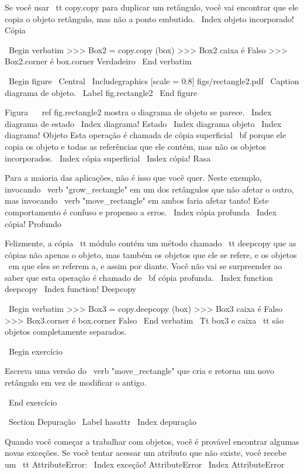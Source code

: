\documentclass[10pt]{book}
\begin{document}
{{{{{{{{{{{{{Se você usar {\ tt copy.copy} para duplicar um retângulo, você vai encontrar
que ele copia o objeto retângulo, mas não a ponto embutido.
\ Index {objeto incorporado! Cópia}

\ Begin {verbatim}
>>> Box2 = copy.copy (box)
>>> Box2 caixa é
Falso
>>> Box2.corner é box.corner
Verdadeiro
\ End {verbatim}

\ Begin {figure}
\ Central
{\ Includegraphics [scale = 0.8] {figs/rectangle2.pdf}}
\ Caption {diagrama de objeto.}
\ Label {} fig.rectangle2
\ End {figure}

Figura ~ \ ref {} fig.rectangle2 mostra o diagrama de objeto se parece.
\ Index {diagrama de estado}
\ Index {diagrama! Estado}
\ Index {diagrama objeto}
\ Index {diagrama! Objeto}
Esta operação é chamada de {cópia superficial \ bf} porque ele copia os
objeto e todas as referências que ele contém, mas não os objetos incorporados.
\ Index {cópia superficial}
\ Index {cópia! Rasa}

Para a maioria das aplicações, não é isso que você quer. Neste exemplo,
invocando \ verb "grow_rectangle" em um dos retângulos que não
afetar o outro, mas invocando \ verb "move_rectangle" em ambos faria
afetar tanto! Este comportamento é confuso e propenso a erros.
\ Index {cópia profunda}
\ Index {cópia! Profundo}

Felizmente, a cópia {\ tt} módulo contém um método chamado {\ tt
deepcopy} que as cópias não apenas o objeto, mas também 
os objetos que ele se refere, e os objetos {\ em que eles se referem a},
e assim por diante.
Você não vai se surpreender ao saber que esta operação é
chamado de {\ bf cópia profunda}.
\ Index {function deepcopy}
\ Index {function! Deepcopy}

\ Begin {verbatim}
>>> Box3 = copy.deepcopy (box)
>>> Box3 caixa é
Falso
>>> Box3.corner é box.corner
Falso
\ End {verbatim}
%
{\ Tt box3} e {caixa \ tt} são objetos completamente separados.


\ Begin {} exercício

Escreva uma versão do \ verb "move_rectangle" que cria e
retorna um novo retângulo em vez de modificar o antigo.

\ End {} exercício


\ Section {} Depuração
\ Label {} hasattr
\ Index {depuração}

Quando você começar a trabalhar com objetos, você é provável encontrar
algumas novas exceções. Se você tentar acessar um atributo
que não existe, você recebe um {\ tt AttributeError}:
\ Index {exceção! AttributeError}
\ Index {} AttributeError

}}}}}}}}}}}}}
\end{document}
